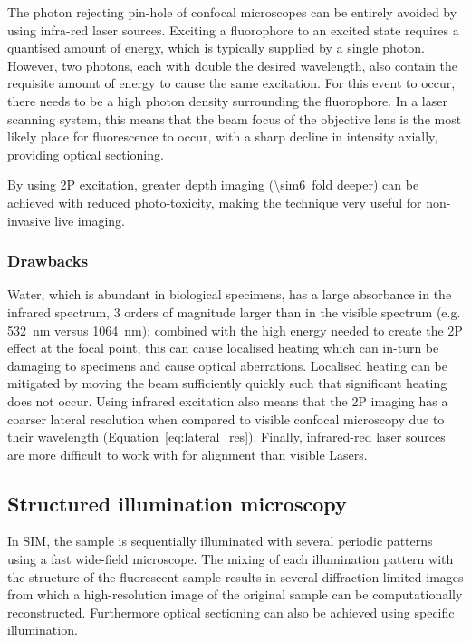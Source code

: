 The photon rejecting pin-hole of \gls{confocal microscope}s can be entirely avoided by using infra-red laser sources.
Exciting a \gls{fluorophore} to an excited state requires a quantised amount of energy, which is typically supplied by a single photon.
However, two photons, each with double the desired wavelength, also contain the requisite amount of energy to cause the same excitation.
For this event to occur, there needs to be a high photon density surrounding the \gls{fluorophore}.
In a laser scanning system, this means that the beam focus of the \gls{objective lens} is the most likely place for fluorescence to occur, with a sharp decline in intensity axially, providing optical sectioning.

By using \gls{2P} excitation, greater depth imaging (\SI{\sim6}{fold} deeper) can be achieved with reduced \gls{photo-toxicity}, making the technique very useful for non-invasive live imaging.

\subsubsection{Drawbacks} %

Water, which is abundant in biological specimens, has a large absorbance in the infrared spectrum, 3 orders of magnitude larger than in the visible spectrum (e.g. \SI{532}{\nano\meter} versus \SI{1064}{\nano\meter});
combined with the high energy needed to create the \gls{2P} effect at the focal point, this can cause localised heating which can in-turn be damaging to specimens and cause optical \gls{aberration}s.
Localised heating can be mitigated by moving the beam sufficiently quickly such that significant heating does not occur.
Using infrared excitation also means that the \gls{2P} imaging has a coarser lateral resolution when compared to visible confocal microscopy due to their wavelength (Equation~\eqref{eq:lateral_res}).
Finally, infrared-red laser sources are more difficult to work with for alignment than visible \gls{Laser}s.

\subsection{Structured illumination microscopy}\label{sec:SIM_theory}

In \gls{SIM}, the sample is sequentially illuminated with several periodic patterns using a fast \gls{wide-field} microscope.
The mixing of each illumination pattern with the structure of the fluorescent sample results in several diffraction limited images from which a high-resolution image of the original sample can be computationally reconstructed.
Furthermore optical sectioning can also be achieved using specific illumination.

